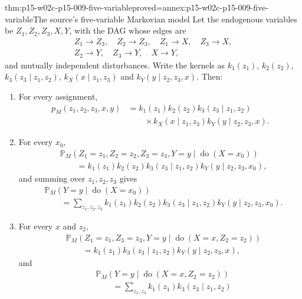 \begin{hbtheorem}{thm:p15-w02c-p15-009-five-variable}{proved=annex:p15-w02c-p15-009-five-variable}{The source's five-variable Markovian model}
Let the endogenous variables be \(Z_1,Z_2,Z_3,X,Y\), with the DAG whose
edges are
\[
\begin{gathered}
 Z_1\to Z_3,\quad Z_2\to Z_3,\quad Z_1\to X,\quad Z_3\to X,\\
 Z_2\to Y,\quad Z_3\to Y,\quad X\to Y,
\end{gathered}
\]
and mutually independent disturbances. Write the kernels as
\(k_1(z_1)\), \(k_2(z_2)\), \(k_3(z_3\mid z_1,z_2)\),
\(k_X(x\mid z_1,z_3)\) and \(k_Y(y\mid z_2,z_3,x)\). Then:
\begin{enumerate}
\item For every assignment,
      \[
      \begin{aligned}
       p_M(z_1,z_2,z_3,x,y)
       &=k_1(z_1)k_2(z_2)k_3(z_3\mid z_1,z_2)\\
       &\qquad\times k_X(x\mid z_1,z_3)k_Y(y\mid z_2,z_3,x).
      \end{aligned}
      \]
\item For every \(x_0\),
      \[
      \begin{aligned}
       &\mathbb P_M(Z_1=z_1,Z_2=z_2,Z_3=z_3,Y=y\mid
                    \operatorname{do}(X=x_0))\\
       &\qquad=k_1(z_1)k_2(z_2)k_3(z_3\mid z_1,z_2)
               k_Y(y\mid z_2,z_3,x_0),
      \end{aligned}
      \]
      and summing over \(z_1,z_2,z_3\) gives
      \[
      \begin{aligned}
       &\mathbb P_M(Y=y\mid\operatorname{do}(X=x_0))\\
       &\qquad=\sum_{z_1,z_2,z_3}k_1(z_1)k_2(z_2)k_3(z_3\mid z_1,z_2)
                         k_Y(y\mid z_2,z_3,x_0).
      \end{aligned}
      \]
\item For every \(x\) and \(z_2\),
      \[
      \begin{aligned}
       &\mathbb P_M(Z_1=z_1,Z_3=z_3,Y=y\mid
                    \operatorname{do}(X=x,Z_2=z_2))\\
       &\qquad=k_1(z_1)k_3(z_3\mid z_1,z_2)k_Y(y\mid z_2,z_3,x),
      \end{aligned}
      \]
      and
      \[
      \begin{aligned}
       &\mathbb P_M(Y=y\mid\operatorname{do}(X=x,Z_2=z_2))\\
       &\qquad=\sum_{z_1,z_3}k_1(z_1)k_3(z_3\mid z_1,z_2)

\end{aligned}\]
\end{enumerate}
\end{hbtheorem}
